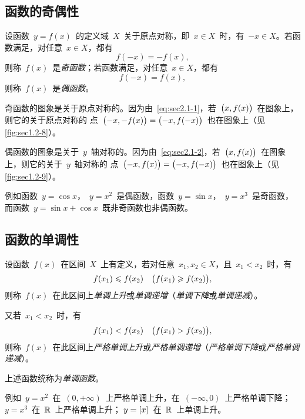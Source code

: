 \subsection{函数的奇偶性}

设函数~$y=f(x)$~的定义域~$X$~关于原点对称，即~$x\in X$~时，有~$-x\in X$。若函数满足，对任意~$x\in X$，都有
\begin{equation}\label{eq:sec2.1-1}
f(-x)=-f(x),
\end{equation}
则称~$f(x)$~是\emph{奇函数}；若函数满足，对任意~$x\in X$，都有
\begin{equation}\label{eq:sec2.1-2}
f(-x)=f(x),
\end{equation}
则称~$f(x)$~是\emph{偶函数}。

奇函数的图象是关于原点对称的。因为由~\ref{eq:sec2.1-1}，若~$\bigl\lparen x,f(x)\bigr\rparen$~在图象上，则它的关于原点对称的
点~$\bigl\lparen-x,-f(x)\bigr\rparen=\bigl\lparen-x,f(-x)\bigr\rparen$~也在图象上（见\ref{fig:sec1.2-8}）。

偶函数的图象是关于~$y$~轴对称的。因为由~\ref{eq:sec2.1-2}，若~$\bigl\lparen x,f(x)\bigr\rparen$~在图象上，则它的关于~$y$~轴对称的
点~$\bigl\lparen-x,f(x)\bigr\rparen=\bigl\lparen-x,f(-x)\bigr\rparen$~也在图象上（见\ref{fig:sec1.2-9}）。

\begin{figure}
\begin{floatrow}[2]
          {\somefigure}
          {\somefigure}
\end{floatrow}
\end{figure}

例如函数~$y=\cos x$，~$y=x^2$~是偶函数，函数~$y=\sin x$，~$y=x^3$~是奇函数，而函数~$y=\sin x+\cos x$~既非奇函数也非偶函数。

\subsection{函数的单调性}

设函数~$f(x)$~在区间~$X$~上有定义，若对任意~$x_1,x_2\in X$，且~$x_1<x_2$~时，有
\[
  f(x_1)\leqslant f(x_2)\quad\bigl\lparen f(x_1)\geqslant f(x_2)\bigr\rparen,
\]
则称~$f(x)$~在此区间上\emph{单调上升}或\emph{单调递增}（\emph{单调下降}或\emph{单调递减}）。

又若~$x_1<x_2$~时，有
\[
  f(x_1)<f(x_2)\quad\bigl\lparen f(x_1)>f(x_2)\bigr\rparen,
\]
则称~$f(x)$~在此区间上\emph{严格单调上升}或\emph{严格单调递增}（\emph{严格单调下降}或\emph{严格单调递减}）。

上述函数统称为\emph{单调函数}。

例如~$y=x^2$~在~$(0,+\infty)$~上严格单调上升，在~$(-\infty,0)$~上严格单调下降；$y=x^3$~在~$\mathbb{R}$~上严格单调上升；%
$y=\lbrack x\rbrack$~在~$\mathbb{R}$~上单调上升。

